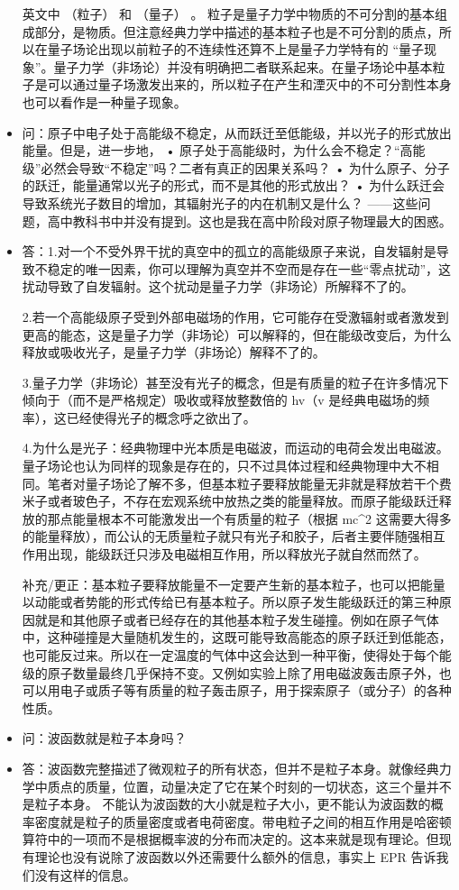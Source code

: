 \begin{itemize}
英文中 （粒子） 和 （量子） 。 粒子是量子力学中物质的不可分割的基本组成部分，是物质。但注意经典力学中描述的基本粒子也是不可分割的质点，所以在量子场论出现以前粒子的不连续性还算不上是量子力学特有的 “量子现象”。量子力学（非场论）并没有明确把二者联系起来。在量子场论中基本粒子是可以通过量子场激发出来的，所以粒子在产生和湮灭中的不可分割性本身也可以看作是一种量子现象。
\item 问：原子中电子处于高能级不稳定，从而跃迁至低能级，并以光子的形式放出能量。但是，进一步地，
• 原子处于高能级时，为什么会不稳定？“高能级”必然会导致“不稳定”吗？二者有真正的因果关系吗？
• 为什么原子、分子的跃迁，能量通常以光子的形式，而不是其他的形式放出？
• 为什么跃迁会导致系统光子数目的增加，其辐射光子的内在机制又是什么？
——这些问题，高中教科书中并没有提到。这也是我在高中阶段对原子物理最大的困惑。
\item 答：1.对一个不受外界干扰的真空中的孤立的高能级原子来说，自发辐射是导致不稳定的唯一因素，你可以理解为真空并不空而是存在一些“零点扰动”，这扰动导致了自发辐射。这个扰动是量子力学（非场论）所解释不了的。

2.若一个高能级原子受到外部电磁场的作用，它可能存在受激辐射或者激发到更高的能态，这是量子力学（非场论）可以解释的，但在能级改变后，为什么释放或吸收光子，是量子力学（非场论）解释不了的。

3.量子力学（非场论）甚至没有光子的概念，但是有质量的粒子在许多情况下倾向于（而不是严格规定）吸收或释放整数倍的 hv（v 是经典电磁场的频率），这已经使得光子的概念呼之欲出了。

4.为什么是光子：经典物理中光本质是电磁波，而运动的电荷会发出电磁波。量子场论也认为同样的现象是存在的，只不过具体过程和经典物理中大不相同。笔者对量子场论了解不多，但基本粒子要释放能量无非就是释放若干个费米子或者玻色子，不存在宏观系统中放热之类的能量释放。而原子能级跃迁释放的那点能量根本不可能激发出一个有质量的粒子（根据 mc^2 这需要大得多的能量释放），而公认的无质量粒子就只有光子和胶子，后者主要伴随强相互作用出现，能级跃迁只涉及电磁相互作用，所以释放光子就自然而然了。

补充/更正：基本粒子要释放能量不一定要产生新的基本粒子，也可以把能量以动能或者势能的形式传给已有基本粒子。所以原子发生能级跃迁的第三种原因就是和其他原子或者已经存在的其他基本粒子发生碰撞。例如在原子气体中，这种碰撞是大量随机发生的，这既可能导致高能态的原子跃迁到低能态，也可能反过来。所以在一定温度的气体中这会达到一种平衡，使得处于每个能级的原子数量最终几乎保持不变。又例如实验上除了用电磁波轰击原子外，也可以用电子或质子等有质量的粒子轰击原子，用于探索原子（或分子）的各种性质。
\item 问：波函数就是粒子本身吗？
\item 答：波函数完整描述了微观粒子的所有状态，但并不是粒子本身。就像经典力学中质点的质量，位置，动量决定了它在某个时刻的一切状态，这三个量并不是粒子本身。 不能认为波函数的大小就是粒子大小，更不能认为波函数的概率密度就是粒子的质量密度或者电荷密度。带电粒子之间的相互作用是哈密顿算符中的一项而不是根据概率波的分布而决定的。这本来就是现有理论。但现有理论也没有说除了波函数以外还需要什么额外的信息，事实上 EPR 告诉我们没有这样的信息。


\end{itemize}
